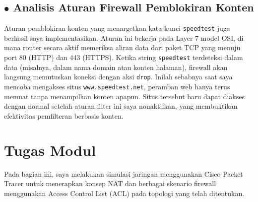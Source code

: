 \subsection*{$\bullet$ Analisis Aturan Firewall Pemblokiran Konten}
Aturan pemblokiran konten yang menargetkan kata kunci \texttt{speedtest} juga berhasil saya implementasikan. Aturan ini bekerja pada Layer 7 model OSI, di mana router secara aktif memeriksa aliran data dari paket TCP yang menuju port 80 (HTTP) dan 443 (HTTPS). Ketika string \texttt{speedtest} terdeteksi dalam data (misalnya, dalam nama domain atau konten halaman), firewall akan langsung memutuskan koneksi dengan aksi \texttt{drop}. Inilah sebabnya saat saya mencoba mengakses situs \texttt{www.speedtest.net}, peramban web hanya terus memuat tanpa menampilkan konten apapun. Situs tersebut baru dapat diakses dengan normal setelah aturan filter ini saya nonaktifkan, yang membuktikan efektivitas pemfilteran berbasis konten.

\newpage
\section{Tugas Modul}
Pada bagian ini, saya melakukan simulasi jaringan menggunakan Cisco Packet Tracer untuk menerapkan konsep NAT dan berbagai skenario firewall menggunakan Access Control List (ACL) pada topologi yang telah ditentukan.

